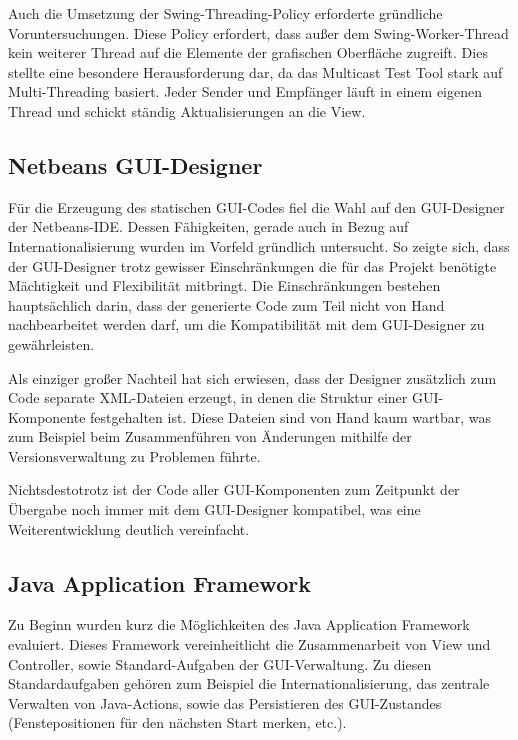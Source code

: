         Auch die Umsetzung der Swing-Threading-Policy erforderte
        gründliche Voruntersuchungen. Diese Policy erfordert, dass außer dem
        Swing-Worker-Thread kein weiterer Thread auf die Elemente der grafischen
        Oberfläche zugreift. Dies stellte eine besondere Herausforderung dar, da
        das Multicast Test Tool stark auf Multi-Threading basiert. Jeder Sender
        und Empfänger läuft in einem eigenen Thread und schickt ständig
        Aktualisierungen an die View.
        
    \subsection{Netbeans GUI-Designer}
    
        Für die Erzeugung des statischen GUI-Codes fiel die Wahl auf den
        GUI-Designer der Netbeans-IDE. Dessen Fähigkeiten, gerade auch in Bezug
        auf Internationalisierung wurden im Vorfeld gründlich untersucht. So
        zeigte sich, dass der GUI-Designer trotz gewisser Einschränkungen die
        für das Projekt benötigte Mächtigkeit und Flexibilität mitbringt. Die
        Einschränkungen bestehen hauptsächlich darin, dass der generierte Code
        zum Teil nicht von Hand nachbearbeitet werden darf, um die
        Kompatibilität mit dem GUI-Designer zu gewährleisten.
        
        Als einziger großer Nachteil hat sich erwiesen, dass der Designer
        zusätzlich zum Code separate XML-Dateien erzeugt, in denen die Struktur
        einer GUI-Komponente festgehalten ist. Diese Dateien sind von Hand kaum
        wartbar, was zum Beispiel beim Zusammenführen von Änderungen mithilfe
        der Versionsverwaltung zu Problemen führte.
        
        Nichtsdestotrotz ist der Code aller GUI-Komponenten zum Zeitpunkt der
        Übergabe noch immer mit dem GUI-Designer kompatibel, was eine
        Weiterentwicklung deutlich vereinfacht.
        
    \subsection{Java Application Framework}
    
        Zu Beginn wurden kurz die Möglichkeiten des Java Application Framework
        evaluiert. Dieses Framework vereinheitlicht die Zusammenarbeit von View
        und Controller, sowie Standard-Aufgaben der GUI-Verwaltung. Zu diesen
        Standardaufgaben gehören zum Beispiel die Internationalisierung, das
        zentrale Verwalten von Java-Actions, sowie das Persistieren des
        GUI-Zustandes (Fenstepositionen für den nächsten Start merken, etc.).
        

